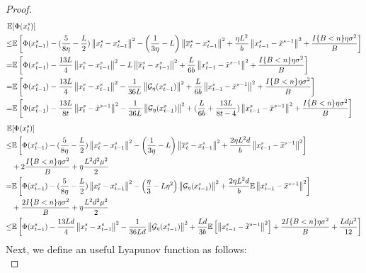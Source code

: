 \documentclass{article}
\newcommand*{\G}{\mathcal{G}}
\newcommand*{\E}{\mathbb{E}}
\newcommand{\norm}[1]{\left\lVert#1\right\rVert}
\theoremstyle{definition}
\theoremstyle{remark}
\begin{document}
\begin{proof}
 \begin{align} 
\E&[\Phi({x}_{t}^s)] \notag
\\ \leq& \E\left[\Phi({x}_{t-1}^s)  -(\frac{5}{8\eta} - \frac{L}{2})\norm{{x}_t^s-x_{t-1}^s}^2- \left(\frac{1}{3\eta}-L\right)\norm{\overline{x}_t^s-x_{t-1}^s}^2+\frac{\eta L^2}{b} \norm{x_{t-1}^s-\tilde{x}^{s-1}}^2 + \frac{I\{B < n\}\eta \sigma ^2}{B}\right]\label{eq30}\\
=& \E\left[\Phi({x}_{t-1}^s)  -\frac{13L}{4}\norm{{x}_t^s-x_{t-1}^s}^2- L\norm{\overline{x}_t^s-x_{t-1}^s}^2+\frac{L}{6b} \norm{x_{t-1}^s-\tilde{x}^{s-1}}^2 + \frac{I\{B < n\}\eta \sigma ^2}{B}\right]\label{eq31}\\
=& \E\left[\Phi({x}_{t-1}^s)  -\frac{13L}{4}\norm{{x}_t^s-x_{t-1}^s}^2- \frac{1}{36 L}\norm{\G_{\eta}(x_{t-1}^s)}^2+\frac{L}{6b} \norm{x_{t-1}^s-\tilde{x}^{s-1}}^2 + \frac{I\{B < n\}\eta \sigma ^2}{B}\right]\label{eq32}\\
=& \E\left[\Phi({x}_{t-1}^s)  -\frac{13L}{8t}\norm{{x}_t^s-\tilde{x}^{s-1}}^2- \frac{1}{36 L}\norm{\G_{\eta}(x_{t-1}^s)}^2+(\frac{L}{6b}+\frac{13L}{8t-4}) \norm{x_{t-1}^s-\tilde{x}^{s-1}}^2 + \frac{I\{B < n\}\eta \sigma ^2}{B}\right]\label{eq33}
 \end{align}
{\color{blue}
 \begin{align} 
\E&[\Phi({x}_{t}^s)] \notag
\\ \leq& \E\left[\Phi({x}_{t-1}^s)  -(\frac{5}{8\eta} - \frac{L}{2})\norm{{x}_t^s-x_{t-1}^s}^2- \left(\frac{1}{3\eta}-L\right)\norm{\overline{x}_t^s-x_{t-1}^s}^2+\frac{2\eta L^2 d}{b}\norm{x_{t-1}^s-\widetilde{x}^{s-1}}^2\right]\\
&+ 2\frac{I\{B < n\}\eta \sigma ^2}{B}+\eta \frac{L^2 d^2 \mu^2}{2}\label{eq30}\\
= & \E\left[\Phi({x}_{t-1}^s)  -(\frac{5}{8\eta} - \frac{L}{2})\norm{{x}_t^s-x_{t-1}^s}^2- \left(\frac{\eta}{3}-L\eta^2\right)\norm{\G_{\eta}(x_{t-1}^s)}^2+\frac{2\eta L^2 d}{b}\E\norm{x_{t-1}^s-\widetilde{x}^{s-1}}^2\right]
\\&+ \frac{2I\{B < n\}\eta \sigma ^2}{B}+\eta \frac{L^2 d^2 \mu^2}{2}\label{eq31}\\
\leq& \E\left[\Phi({x}_{t-1}^s)  -\frac{13Ld}{4}\norm{{x}_t^s-x_{t-1}^s}^2- \frac{1}{36 Ld}\norm{\G_{\eta}(x_{t-1}^s)}^2+\frac{L d}{3b}\E\left[\norm{x_{t-1}^s-\widetilde{x}^{s-1}}^2\right]+ \frac{2I\{B < n\}\eta \sigma ^2}{B}+ \frac{L d \mu^2}{12}\right]\label{eq32}
 \end{align}
 {\color{Green}
 Next, we define an useful Lyapunov function as follows:
 \begin{equation}

\end{equation}}}
\end{proof}
\end{document}
